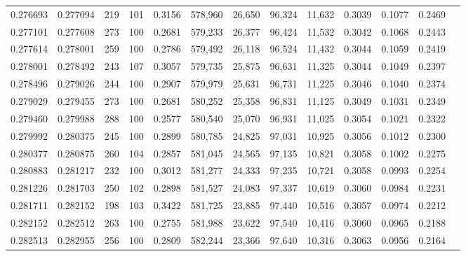 \begin{tabular}{rrrrrrrrrrrrr}
0.276693 & 0.277094 &   219 & 101 &                                     0.3156 & 578,960 &  26,650 &  96,324 &  11,632 & 0.3039 & 0.1077 & 0.2469 \\
0.277101 & 0.277608 &   273 & 100 &                                     0.2681 & 579,233 &  26,377 &  96,424 &  11,532 & 0.3042 & 0.1068 & 0.2443 \\
0.277614 & 0.278001 &   259 & 100 &                                     0.2786 & 579,492 &  26,118 &  96,524 &  11,432 & 0.3044 & 0.1059 & 0.2419 \\
0.278001 & 0.278492 &   243 & 107 &                                     0.3057 & 579,735 &  25,875 &  96,631 &  11,325 & 0.3044 & 0.1049 & 0.2397 \\
0.278496 & 0.279026 &   244 & 100 &                                     0.2907 & 579,979 &  25,631 &  96,731 &  11,225 & 0.3046 & 0.1040 & 0.2374 \\
0.279029 & 0.279455 &   273 & 100 &                                     0.2681 & 580,252 &  25,358 &  96,831 &  11,125 & 0.3049 & 0.1031 & 0.2349 \\
0.279460 & 0.279988 &   288 & 100 &                                     0.2577 & 580,540 &  25,070 &  96,931 &  11,025 & 0.3054 & 0.1021 & 0.2322 \\
0.279992 & 0.280375 &   245 & 100 &                                     0.2899 & 580,785 &  24,825 &  97,031 &  10,925 & 0.3056 & 0.1012 & 0.2300 \\
0.280377 & 0.280875 &   260 & 104 &                                     0.2857 & 581,045 &  24,565 &  97,135 &  10,821 & 0.3058 & 0.1002 & 0.2275 \\
0.280883 & 0.281217 &   232 & 100 &                                     0.3012 & 581,277 &  24,333 &  97,235 &  10,721 & 0.3058 & 0.0993 & 0.2254 \\
0.281226 & 0.281703 &   250 & 102 &                                     0.2898 & 581,527 &  24,083 &  97,337 &  10,619 & 0.3060 & 0.0984 & 0.2231 \\
0.281711 & 0.282152 &   198 & 103 &                                     0.3422 & 581,725 &  23,885 &  97,440 &  10,516 & 0.3057 & 0.0974 & 0.2212 \\
0.282152 & 0.282512 &   263 & 100 &                                     0.2755 & 581,988 &  23,622 &  97,540 &  10,416 & 0.3060 & 0.0965 & 0.2188 \\
0.282513 & 0.282955 &   256 & 100 &                                     0.2809 & 582,244 &  23,366 &  97,640 &  10,316 & 0.3063 & 0.0956 & 0.2164 \\

\end{tabular}
